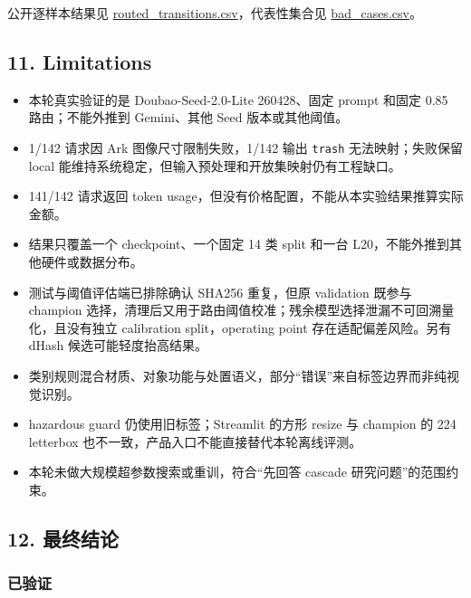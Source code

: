 \documentclass[
  a4paper,
]{article}
\providecommand{\tightlist}{%
  \setlength{\itemsep}{0pt}\setlength{\parskip}{0pt}}
\begin{document}
公开逐样本结果见
\href{../docs/portfolio/data/routed_transitions.csv}{routed\_transitions.csv}，代表性集合见
\href{../docs/portfolio/data/bad_cases.csv}{bad\_cases.csv}。

\hypertarget{11-limitations}{%
\subsection{11. Limitations}\label{11-limitations}}

\begin{itemize}
\tightlist
\item
  本轮真实验证的是 Doubao-Seed-2.0-Lite 260428、固定 prompt 和固定 0.85
  路由；不能外推到 Gemini、其他 Seed 版本或其他阈值。
\item
  1/142 请求因 Ark 图像尺寸限制失败，1/142 输出 \texttt{trash}
  无法映射；失败保留 local
  能维持系统稳定，但输入预处理和开放集映射仍有工程缺口。
\item
  141/142 请求返回 token
  usage，但没有价格配置，不能从本实验结果推算实际金额。
\item
  结果只覆盖一个 checkpoint、一个固定 14 类 split 和一台
  L20，不能外推到其他硬件或数据分布。
\item
  测试与阈值评估端已排除确认 SHA256 重复，但原 validation 既参与
  champion
  选择，清理后又用于路由阈值校准；残余模型选择泄漏不可回溯量化，且没有独立
  calibration split，operating point 存在适配偏差风险。另有 dHash
  候选可能轻度抬高结果。
\item
  类别规则混合材质、对象功能与处置语义，部分``错误''来自标签边界而非纯视觉识别。
\item
  hazardous guard 仍使用旧标签；Streamlit 的方形 resize 与 champion 的
  224 letterbox 也不一致，产品入口不能直接替代本轮离线评测。
\item
  本轮未做大规模超参数搜索或重训，符合``先回答 cascade
  研究问题''的范围约束。
\end{itemize}

\hypertarget{12-ux6700ux7ec8ux7ed3ux8bba}{%
\subsection{12. 最终结论}\label{12-ux6700ux7ec8ux7ed3ux8bba}}

\hypertarget{ux5df2ux9a8cux8bc1}{%
\subsubsection{已验证}\label{ux5df2ux9a8cux8bc1}}
\end{document}
